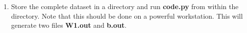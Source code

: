 \documentclass[journal,12pt,twocolumn]{IEEEtran}
\renewcommand\thesection{\arabic{section}}
\begin{document}
\begin{enumerate}[label=\thesection.\arabic*
,ref=\thesection.\theenumi]
\solution From  \eqref{eq:cost} and \eqref{eq:model}, 
\begin{align}
J\brak{\mbf{W},\mbf{b}}  &= \frac{1}{2}\norm{\mbf{y}-\hat{\mbf{y}}}^2
\\
&=\brak{\mbf{W}\mbf{x}+\mbf{b}-\mbf{y}}^T\brak{\mbf{W}\mbf{x}+\mbf{b}-\mbf{y}}
\\
&=\brak{\mbf{x}^T\mbf{W}^T+\mbf{b}^T-\mbf{y}^T}\brak{\mbf{W}\mbf{x}+\mbf{b}-\mbf{y}}
\\
&=\mbf{W}^T\mbf{x}^T\mbf{x}\mbf{W}+\mbf{W}^T\mbf{x}^T\mbf{b}-\mbf{W}^T\mbf{x}^T\mbf{y}
\\
&\,+\mbf{b}^T\mbf{x}\mbf{W}+\mbf{b}^T\mbf{b}-\mbf{b}^T\mbf{y} - \mbf{y}^T\mbf{x}\mbf{W}
\\
& \, -  \mbf{y}^T\mbf{b} +  \mbf{y}^T \mbf{y}
\label{eq:expand_cost}
\end{align}
Using
\begin{align}
\frac{\partial}{\partial\mbf{W}}\mbf{W}^T\mbf{x}^T\mbf{x}\mbf{W}
&= 
\end{align} 
\item Store the complete dataset in a directory and run \textbf{code.py} from  within the 
directory.  Note that this should be done on a powerful workstation. This will generate two files
\textbf{W1.out} and \textbf{b.out}.
\end{enumerate}
\end{document}
